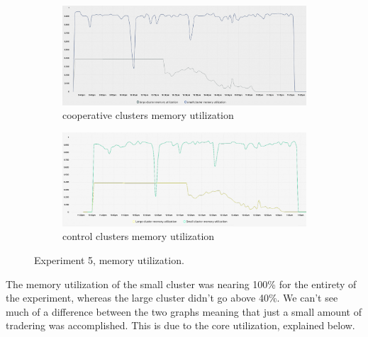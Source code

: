 \begin{figure}[H]
\centering
\begin{subfigure}{.5\textwidth}
  \centering
  \includegraphics[width=.9\linewidth]{./figures/experiment-five/alibaba-mem-coop.png}
  \caption{cooperative clusters memory utilization}
  \label{fig:exp5coopmem}
\end{subfigure}%
\begin{subfigure}{.5\textwidth}
  \centering
  \includegraphics[width=.9\linewidth]{./figures/experiment-five/alibaba-mem-control.png}
  \caption{control clusters memory utilization}
  \label{fig:exp5controlmem}
\end{subfigure}
\caption{Experiment 5, memory utilization.}
\label{fig:exp5memutil}
\end{figure}

The memory utilization of the small cluster was nearing 100\% for the entirety
of the experiment, whereas the large cluster didn't go above 40\%. We can't see
much of a difference between the two graphs meaning that just a small amount of
tradering was accomplished. This is due to the core utilization, explained
below.

